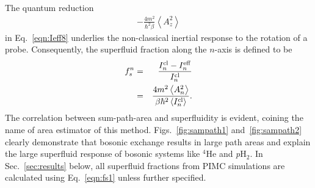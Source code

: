 \documentclass[12pt]{iopart}
\newcommand{\phtwo}{{\em p}H$_2$}
\begin{document}
The quantum reduction
\begin{eqnarray}
-\frac{4m^2}{\hbar^2\beta}\left< A_z^2 \right>
\end{eqnarray}
in Eq.~\ref{eqn:Ieff8} underlies the non-classical inertial response to the rotation of a probe. 
Consequently, the superfluid fraction along the $n$-axis is defined to be~\cite{ceperley_area_estim, sindzingre_pH2_superfluid,ceperley_rmp_1995}
\begin{eqnarray}
f_s^n&=&\frac{I^{\rm cl}_n-I^{\rm eff}_n}{I^{\rm cl}_n} \nonumber\\
&=&\frac{4m^2\left< A^2_n\right>}{\beta\hbar^2\left< I^{\rm cl}_n\right>}. \label{eqn:fs1}
\end{eqnarray}
The correlation between sum-path-area and superfluidity is evident, coining the name of area estimator of this method. Figs.~\ref{fig:sampath1} and~\ref{fig:sampath2} clearly demonstrate that bosonic exchange results in large path areas and explain the large superfluid response of bosonic systems like $^4$He and \phtwo. In Sec.~\ref{sec:results} below, all superfluid fractions from PIMC simulations are calculated using Eq.~\ref{eqn:fs1} unless further specified.
\end{document}
